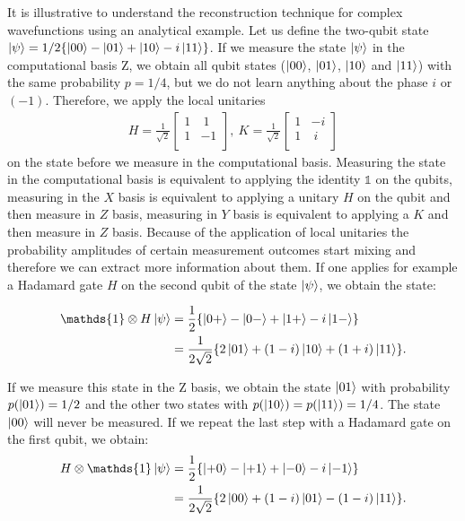 \documentclass[submission, Phys]{SciPost}
\begin{document}
It is illustrative to understand the reconstruction technique for complex wavefunctions using an analytical example.  Let us define
the two-qubit state
$\ket{\psi} = 1/2 \{ \ket{00} - \ket{01} + \ket{10} - i \ket{11} \}$.
If we measure the state $\ket{\psi}$ in the computational basis Z, we obtain all qubit states ($\ket{00}$, $\ket{01}$, $\ket{10}$ and $\ket{11}$) with the same probability $p = 1/4$, but we do not learn anything about the phase $i$ or $(-1)$.
Therefore, we apply the local unitaries
\begin{align}
	H = \frac{1}{\sqrt{2}}
	\begin{bmatrix}
		1 & ~1 \\
		1 & -1 \\
	\end{bmatrix},~
	K = \frac{1}{\sqrt{2}}
	\begin{bmatrix}
		1 & -i \\
		1 & ~i \\
	\end{bmatrix}  \label{Unitaries}
\end{align}
on the state before we measure in the computational basis. Measuring the state in the computational basis is equivalent to applying the identity $\mathds{1}$ on the qubits, measuring in the $X$ basis is equivalent to applying a unitary $H$ on the qubit and then measure in $Z$ basis, measuring in $Y$ basis is equivalent to applying a $K$ and then measure in $Z$ basis. Because of the application of local unitaries the probability amplitudes of certain measurement outcomes start mixing and therefore we can extract more information about them. If one applies for example a Hadamard gate $H$ on the second qubit of the state $\ket{\psi}$, we obtain the state:

\begin{align}
	\mathds{1} \otimes H \ket{\psi} & = \frac{1}{2} \{ \ket{0+} - \ket{0-} + \ket{1+} - i \ket{1-} \}          \\
	                                & = \frac{1}{2 \sqrt{2}} \{ 2 \ket{01} + (1-i)\ket{10} + (1+i)\ket{11} \}.
\end{align}

If we measure this state in the Z basis, we obtain the state $\ket{01}$ with probability $p(\ket{01}) = 1/2$
and the other two states with $p(\ket{10}) = p(\ket{11}) = 1/4$.
The state $\ket{00}$ will never be measured. If we repeat the last step with a Hadamard gate on the first qubit, we obtain:
\begin{align}
	H \otimes \mathds{1} \ket{\psi} & = \frac{1}{2} \{ \ket{+0} - \ket{+1} + \ket{-0} - i \ket{-1} \}          \\
	                                & = \frac{1}{2 \sqrt{2}} \{ 2 \ket{00} + (1-i)\ket{01} - (1-i)\ket{11} \}.
\end{align}
\end{document}
